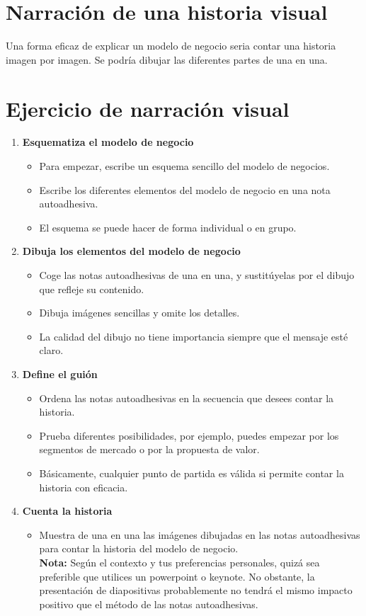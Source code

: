 \documentclass[11pt]{book}
\begin{document}
\section{Narración de una historia visual}
Una forma eficaz de explicar un modelo de negocio seria contar una historia imagen por imagen. Se podría dibujar las diferentes partes de una en una.
\section{Ejercicio de narración visual}
\begin{enumerate}
\item \textbf{Esquematiza el modelo de negocio}
\begin{itemize}
\item Para empezar, escribe un esquema sencillo del modelo de negocios.
\item Escribe los diferentes elementos del modelo de negocio en una nota autoadhesiva.
\item El esquema se puede hacer de forma individual o en grupo.
\end{itemize}
\item \textbf{Dibuja los elementos del modelo de negocio}
\begin{itemize}
\item Coge las notas autoadhesivas de una en una, y sustitúyelas por el dibujo que refleje su contenido.
\item Dibuja imágenes sencillas y omite los detalles.
\item La calidad del dibujo no tiene importancia siempre que el mensaje esté claro.
\end{itemize}
\item \textbf{Define el guión}
\begin{itemize}
\item Ordena las notas autoadhesivas en la secuencia que desees contar la historia.
\item Prueba diferentes posibilidades, por ejemplo, puedes empezar por los segmentos de mercado o por la propuesta de valor.
\item Básicamente, cualquier punto de partida es válida si permite contar la historia con eficacia.
\end{itemize}
\item \textbf{Cuenta la historia}
\begin{itemize}
\item Muestra de una en una las imágenes dibujadas en las notas autoadhesivas para contar la historia del modelo de negocio.\\
\textbf{Nota: } Según el contexto y tus preferencias personales, quizá sea preferible que utilices un powerpoint o keynote. No obstante, la presentación de diapositivas probablemente no tendrá el mismo impacto positivo que el método de las notas autoadhesivas.
\end{itemize}
\end{enumerate}
\end{document}
